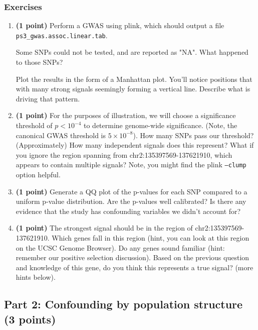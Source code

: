 \documentclass[12pt]{article}
\begin{document}
\subsubsection*{Exercises}
\begin{enumerate}
\item \textbf{(1 point)} Perform a GWAS using plink, which should output a file \texttt{ps3\_gwas.assoc.linear.tab}. 

Some SNPs could not be tested, and are reported as "NA". What happened to those SNPs?

Plot the results in the form of a Manhattan plot. You'll notice positions that with many strong signals seemingly forming a vertical line. Describe what is driving that pattern.

\item \textbf{(1 point)} 
For the purposes of illustration, we will choose a significance threshold of $p<10^{-4}$ to determine genome-wide significance. (Note, the canonical GWAS threshold is $5 \times 10^{-8}$). How many SNPs pass our threshold? (Approximately) How many independent signals does this represent? What if you ignore the region spanning from chr2:135397569-137621910, which appears to contain multiple signals? Note, you might find the plink \texttt{--clump} option helpful.

\item \textbf{(1 point)} Generate a QQ plot of the p-values for each SNP compared to a uniform p-value distribution. Are the p-values well calibrated? Is there any evidence that the study has confounding variables we didn't account for?

\item \textbf{(1 point)} The strongest signal should be in the region of chr2:135397569-137621910. Which genes fall in this region (hint, you can look at this region on the UCSC Genome Browser). Do any genes sound familiar (hint: remember our positive selection discussion). Based on the previous question and knowledge of this gene, do you think this represents a true signal? (more hints below).

\end{enumerate}

\subsection*{Part 2: Confounding by population structure (3 points)}
\end{document}
